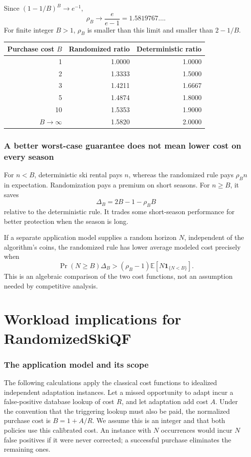 \documentclass[11pt]{article}
\begin{document}
Since $(1-1/B)^B\to e^{-1}$,
\[
\rho_B\longrightarrow\frac{e}{e-1}=1.5819767\ldots.
\]
For finite integer $B>1$, $\rho_B$ is smaller than this limit and smaller than $2-1/B$.
\begin{center}
\begin{tabular}{rrr}
\toprule
Purchase cost $B$&Randomized ratio&Deterministic ratio\\
\midrule
1&1.0000&1.0000\\
2&1.3333&1.5000\\
3&1.4211&1.6667\\
5&1.4874&1.8000\\
10&1.5353&1.9000\\
$B\to\infty$&1.5820&2.0000\\
\bottomrule
\end{tabular}
\end{center}

\section{A better worst-case guarantee does not mean lower cost on every season}
For $n<B$, deterministic ski rental pays $n$, whereas the randomized rule pays $\rho_Bn$ in expectation. Randomization pays a premium on short seasons. For $n\ge B$, it saves
\[
\Delta_B=2B-1-\rho_BB
\]
relative to the deterministic rule. It trades some short-season performance for better protection when the season is long.

If a separate application model supplies a random horizon $N$, independent of the algorithm's coins, the randomized rule has lower average modeled cost precisely when
\[
\Pr(N\ge B)\Delta_B>
(\rho_B-1)\mathbb E[N\mathbf1_{\{N<B\}}].
\]
This is an algebraic comparison of the two cost functions, not an assumption needed by competitive analysis.

\clearpage
\part{Workload implications for RandomizedSkiQF}
\section{The application model and its scope}
The following calculations apply the classical cost functions to idealized independent adaptation instances. Let a missed opportunity to adapt incur a false-positive database lookup of cost $R$, and let adaptation add cost $A$. Under the convention that the triggering lookup must also be paid, the normalized purchase cost is $B=1+A/R$. We assume this is an integer and that both policies use this calibrated cost. An instance with $N$ occurrences would incur $N$ false positives if it were never corrected; a successful purchase eliminates the remaining ones.
\end{document}
